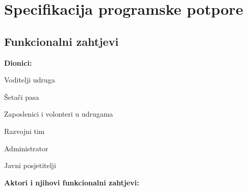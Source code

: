 \chapter{Specifikacija programske potpore}
	
\section{Funkcionalni zahtjevi}
		

		
		\noindent \textbf{Dionici:}
		
		\begin{packed_enum}
			
			\item Voditelji udruga
			\item Šetači pasa			
			\item Zaposlenici i volonteri u udrugama
			\item Razvojni tim
			\item Administrator
			\item Javni posjetitelji
			
		\end{packed_enum}
		\vspace{5mm}
		
		\noindent \textbf{Aktori i njihovi funkcionalni zahtjevi:}
		
